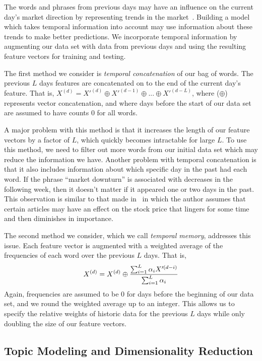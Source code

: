 \documentclass[10pt, twocolumn]{article}
\begin{document}
The words and phrases from previous days may have an influence on the current day's market direction by representing trends in the market~\cite{mlstockmarket}. Building a model which takes temporal information into account may use information about these trends to make better predictions. We incorporate temporal information by augmenting our data set with data from previous days and using the resulting feature vectors for training and testing.

The first method we consider is \textit{temporal concatenation} of our bag of words. The previous $L$ days features are concatenated on to the end of the current day's feature. That is, $X^{(d)} = X'^{(d)} \oplus X'^{(d-1)} \oplus ... \oplus X'^{(d-L)}$, where ($\oplus$) represents vector concatenation, and where days before the start of our data set are assumed to have counts $0$ for all words.

A major problem with this method is that it increases the length of our feature vectors by a factor of $L$, which quickly becomes intractable for large $L$. To use this method, we need to filter out more words from our initial data set which may reduce the information we have. Another problem with temporal concatenation is that it also includes information about which specific day in the past had each word. If the phrase ``market downturn'' is associated with decreases in the following week, then it doesn't matter if it appeared one or two days in the past. This observation is similar to that made in~\cite{mlstockmarket} in which the author assumes that certain articles may have an effect on the stock price that lingers for some time and then diminishes in importance. 

The second method we consider, which we call \textit{temporal memory}, addresses this issue. Each feature vector is augmented with a weighted average of the frequencies of each word over the previous $L$ days. That is, $$\displaystyle X^{(d)} = X^{(d)} \oplus {{\sum^L_{i=1}{\alpha_i X'^{(d-i)}}} \over {\sum^L_{i=1}{\alpha_i}}}$$ Again, frequencies are assumed to be 0 for days before the beginning of our data set, and we round the weighted average up to an integer. This allows us to specify the relative weights of historic data for the previous $L$ days while only doubling the size of our feature vectors. 

\subsection{Topic Modeling and Dimensionality Reduction}
\label{sec:topicmodel}
\end{document}
